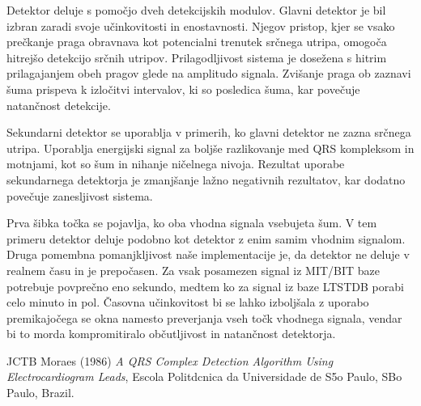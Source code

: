 \documentclass{article}
\begin{document}
    Detektor deluje s pomočjo dveh detekcijskih modulov. Glavni detektor je bil izbran zaradi svoje učinkovitosti in enostavnosti. 
    Njegov pristop, kjer se vsako prečkanje praga obravnava kot potencialni trenutek srčnega utripa, omogoča hitrejšo detekcijo srčnih 
    utripov. Prilagodljivost sistema je dosežena s hitrim prilagajanjem obeh pragov glede na amplitudo signala. Zvišanje praga ob zaznavi 
    šuma prispeva k izločitvi intervalov, ki so posledica šuma, kar povečuje natančnost detekcije.

    Sekundarni detektor se uporablja v primerih, ko glavni detektor ne zazna srčnega utripa. Uporablja energijski signal za boljše 
    razlikovanje med QRS kompleksom in motnjami, kot so šum in nihanje ničelnega nivoja. Rezultat uporabe sekundarnega detektorja 
    je zmanjšanje lažno negativnih rezultatov, kar dodatno povečuje zanesljivost sistema.

    Prva šibka točka se pojavlja, ko oba vhodna signala vsebujeta šum. V tem primeru detektor deluje podobno kot detektor z enim 
    samim vhodnim signalom. Druga pomembna pomanjkljivost naše implementacije je, da detektor ne deluje v realnem času in je 
    prepočasen. Za vsak posamezen signal iz MIT/BIT baze potrebuje povprečno eno sekundo, medtem ko za signal iz baze LTSTDB 
    porabi celo minuto in pol. Časovna učinkovitost bi se lahko izboljšala z uporabo premikajočega se okna namesto preverjanja 
    vseh točk vhodnega signala, vendar bi to morda kompromitiralo občutljivost in natančnost detektorja.

    \begin{thebibliography}{9}
        JCTB Moraes (1986) \emph{A QRS Complex Detection Algorithm Using Electrocardiogram Leads}, Escola Politdcnica da Universidade de S5o Paulo, SBo Paulo, Brazil.
    \end{thebibliography}
\end{document}
